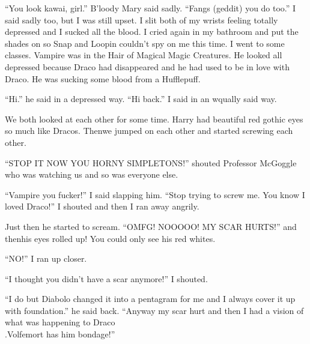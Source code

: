 \enquote{You look kawai, girl.} B'loody Mary said sadly. \enquote{Fangs (geddit) you do too.} I said sadly too, but I was still upset. I slit both of my wrists feeling totally depressed and I sucked all the blood. I cried again in my bathroom and put the shades on so Snap and Loopin couldn't spy on me this time. I went to some classes. Vampire was in the Hair of Magical Magic Creatures. He looked all depressed because Draco had disappeared and he had used to be in love with Draco. He was sucking some blood from a Hufflepuff.

\enquote{Hi.} he said in a depressed way. \enquote{Hi back.} I said in an wqually said way.

We both looked at each other for some time. Harry had beautiful red gothic eyes so much like Dracos. Then\dotfill we jumped on each other and started screwing each other.

\enquote{STOP IT NOW YOU HORNY SIM\-PLE\-TONS\@!} shout\-ed Professor McGoggle who was watching us and so was everyone else.

\enquote{Vampire you fucker!} I said slapping him. \enquote{Stop trying to screw me. You know I loved Draco!} I shouted and then I ran away angrily.

Just then he started to scream. \enquote{OMFG\@! NOOOOO\@! MY SCAR HURTS\@!} and then\dotfill his eyes rolled up! You could only see his red whites.

\enquote{NO!} I ran up closer.

\enquote{I thought you didn't have a scar anymore!} I shouted.

\enquote{I do but Diabolo changed it into a pentagram for me and I always cover it up with foundation.} he said back. \enquote{Anyway my scar hurt and then I had a vision of what was happening to Draco\dotfill\\.\dotfill Volfemort has him bondage!}


